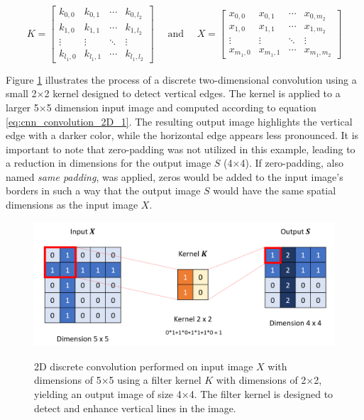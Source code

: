 \begin{equation}
    \label{eq:cnn_convolution_2D_2}
    K=\left[\begin{array}{llll}
    k_{0,0} & k_{0,1} & \cdots & k_{0, l_2} \\
    k_{1,0} & k_{1,1} & \cdots & k_{1, l_2} \\
    \vdots & \vdots & \ddots & \vdots \\
    k_{l_1, 0} & k_{l_1, 1} & \cdots & k_{l_1, l_2}
    \end{array}\right] \quad \text { and } \quad X=\left[\begin{array}{llll}
    x_{0,0} & x_{0,1} & \cdots & x_{0, m_2} \\
    x_{1,0} & x_{1,1} & \cdots & x_{1, m_2} \\
    \vdots & \vdots & \ddots & \vdots \\
    x_{m_1, 0} & x_{m_1, 1} & \cdots & x_{m_1, m_2}
    \end{array}\right]
\end{equation}

Figure \ref{fig:frmwk_cnn_convolution_example} illustrates the process of a discrete two-dimensional convolution using a small 2×2 kernel designed to detect vertical edges. The kernel is applied to a larger 5×5 dimension input image and computed according to equation \ref{eq:cnn_convolution_2D_1}. The resulting output image highlights the vertical edge with a darker color, while the horizontal edge appears less pronounced. It is important to note that zero-padding was not utilized in this example, leading to a reduction in dimensions for the output image $S$ (4×4). If zero-padding, also named \textit{same padding}, was applied, zeros would be added to the input image's borders in such a way that the output image $S$ would have the same spatial dimensions as the input image $X$.

\begin{figure}[htbp]
    \raggedright
        \caption{2D discrete convolution performed on input image $X$ with dimensions of 5×5 using a filter kernel $K$ with dimensions of 2×2, yielding an output image of size 4×4. The filter kernel is designed to detect and enhance vertical lines in the image.}
        \includegraphics[width=.9\textwidth]{resources/images/030-theoretical_framework/Framework_cnn_example.png}
        \label{fig:frmwk_cnn_convolution_example}
\end{figure}

